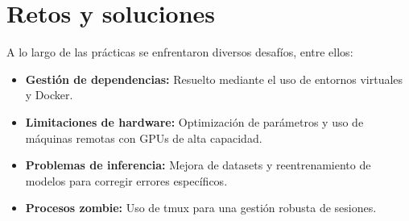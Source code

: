 \section{Retos y soluciones}
\label{sec:retos}

A lo largo de las prácticas se enfrentaron diversos desafíos, entre ellos:

\begin{itemize}
    \item \textbf{Gestión de dependencias:} Resuelto mediante el uso de entornos virtuales y Docker.
    \item \textbf{Limitaciones de hardware:} Optimización de parámetros y uso de máquinas remotas con GPUs de alta capacidad.
    \item \textbf{Problemas de inferencia:} Mejora de datasets y reentrenamiento de modelos para corregir errores específicos.
    \item \textbf{Procesos zombie:} Uso de tmux para una gestión robusta de sesiones.
\end{itemize}